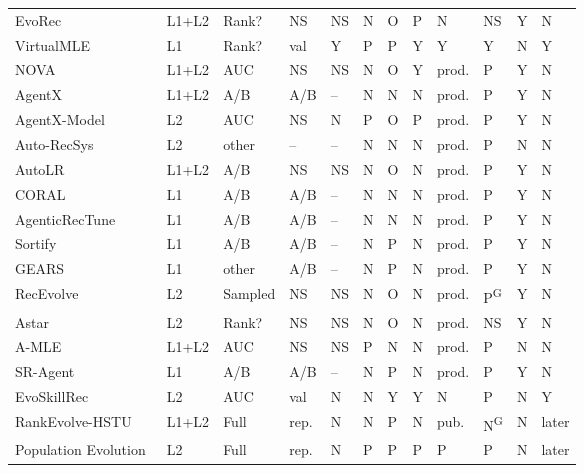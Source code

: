 \documentclass[sigconf,nonacm]{acmart}
\newcommand{\yes}{\textsf{Y}\xspace}
\newcommand{\no}{\textsf{N}\xspace}
\newcommand{\ns}{\textsf{NS}\xspace}
\newcommand{\pa}{\textsf{P}\xspace}
\newcommand{\po}{\textsf{O}\xspace}
\newcommand{\na}{\textsf{--}\xspace}
\begin{document}
\begin{table}[t]
\begin{tabular}{@{}llllllllllll@{}}
EvoRec~\cite{mu2026evorec} & L1+L2 & Rank? & \ns & \ns & \no & \po & \pa & \no & \ns & \yes & \no \\
VirtualMLE~\cite{cao2026virtualmle} & L1 & Rank? & val & \yes & \pa & \pa & \yes & \yes & \yes & \no & \yes \\
NOVA~\cite{liu2026nova} & L1+L2 & AUC & \ns & \ns & \no & \po & \yes & prod. & \pa & \yes & \no \\
AgentX~\cite{lao2026agentx} & L1+L2 & A/B & A/B & \na & \no & \no & \no & prod. & \pa & \yes & \no \\
AgentX-Model~\cite{yang2026agentxmodel} & L2 & AUC & \ns & \no & \pa & \po & \pa & prod. & \pa & \yes & \no \\
Auto-RecSys~\cite{li2026autorecsys} & L2 & other & \na & \na & \no & \no & \no & prod. & \pa & \no & \no \\
AutoLR~\cite{zhang2026autolr} & L1+L2 & A/B & \ns & \ns & \no & \po & \no & prod. & \pa & \yes & \no \\
CORAL~\cite{azhar2026coral} & L1 & A/B & A/B & \na & \no & \no & \no & prod. & \pa & \yes & \no \\
AgenticRecTune~\cite{wu2026agenticrectune} & L1 & A/B & A/B & \na & \no & \no & \no & prod. & \pa & \yes & \no \\
Sortify~\cite{cheng2026sortify} & L1 & A/B & A/B & \na & \no & \pa & \no & prod. & \pa & \yes & \no \\
GEARS~\cite{yun2026gears} & L1 & other & A/B & \na & \no & \pa & \no & prod. & \pa & \yes & \no \\
RecEvolve~\cite{pan2026recevolve} & L2 & Sampled & \ns & \ns & \no & \po & \no & prod. & \pa\textsuperscript{G} & \yes & \no \\
Astar~\cite{hu2026astar} & L2 & Rank? & \ns & \ns & \no & \po & \no & prod. & \ns & \yes & \no \\
A-MLE~\cite{gao2026amle} & L1+L2 & AUC & \ns & \ns & \pa & \no & \no & prod. & \pa & \no & \no \\
SR-Agent~\cite{yang2026sragent} & L1 & A/B & A/B & \na & \no & \pa & \no & prod. & \pa & \yes & \no \\
EvoSkillRec~\cite{li2026evoskillrec} & L2 & AUC & val & \no & \no & \yes & \yes & \no & \pa & \no & \yes \\
RankEvolve-HSTU~\cite{chen2026rankevolve} & L1+L2 & Full & rep. & \no & \no & \pa & \no & pub. & \no\textsuperscript{G} & \no & later \\
Population Evolution~\cite{peng2026population} & L2 & Full & rep. & \no & \pa & \pa & \pa & \pa & \pa & \no & later \\

\end{tabular}
\end{table}
\end{document}
